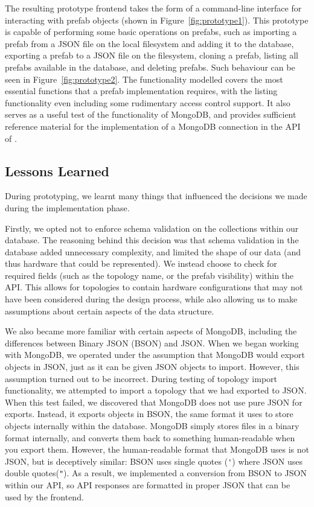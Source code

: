 \documentclass[11pt]{article}
\begin{document}
		The resulting prototype frontend takes the form of a command-line interface for interacting with prefab objects (shown in Figure~\ref{fig:prototype1}).
		This prototype is capable of performing some basic operations on prefabs, such as importing a prefab from a JSON file on the local filesystem and adding it to the database, exporting a prefab to a JSON file on the filesystem, cloning a prefab, listing all prefabs available in the database, and deleting prefabs.
		Such behaviour can be seen in Figure~\ref{fig:prototype2}.
		The functionality modelled covers the most essential functions that a prefab implementation requires, with the listing functionality even including some rudimentary access control support.
		It also serves as a useful test of the functionality of MongoDB, and provides sufficient reference material for the implementation of a MongoDB connection in the API of \opendc{}.

	\subsection{Lessons Learned}
		During prototyping, we learnt many things that influenced the decisions we made during the implementation phase.

		Firstly, we opted not to enforce schema validation on the collections within our database.
		The reasoning behind this decision was that schema validation in the database added unnecessary complexity, and limited the shape of our data (and thus hardware that could be represented).
		We instead choose to check for required fields (such as the topology name, or the prefab visibility) within the API.
		This allows for topologies to contain hardware configurations that may not have been considered during the design process, while also allowing us to make assumptions about certain aspects of the data structure.

		We also became more familiar with certain aspects of MongoDB, including the differences between Binary JSON (BSON) and JSON.
		When we began working with MongoDB, we operated under the assumption that MongoDB would export objects in JSON, just as it can be given JSON objects to import.
		However, this assumption turned out to be incorrect. 
		During testing of topology import functionality, we attempted to import a topology that we had exported to JSON.
		When this test failed, we discovered that MongoDB does not use pure JSON for exports.
		Instead, it exports objects in BSON, the same format it uses to store objects internally within the database.
		MongoDB simply stores files in a binary format internally, and converts them back to something human-readable when you export them. 
		However, the human-readable format that MongoDB uses is not JSON, but is deceptively similar: BSON uses single quotes (\verb|'|) where JSON uses double quotes(\verb|"|).
		As a result, we implemented a conversion from BSON to JSON within our API, so API responses are formatted in proper JSON that can be used by the frontend.
		
\end{document}
